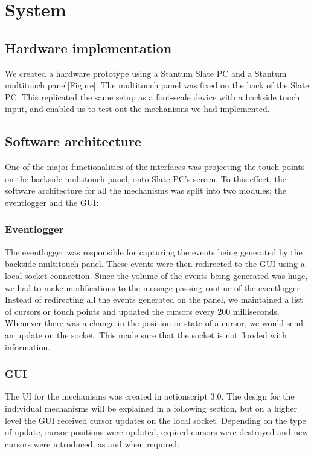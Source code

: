 \section{System}
\subsection{Hardware implementation}
We created a hardware prototype using a Stantum Slate PC and a Stantum multitouch panel[Figure]. The multitouch panel was fixed on the back of the Slate PC. This replicated the same setup as a foot-scale device with a backside touch input, and enabled us to test out the mechanisms we had implemented.
\subsection{Software architecture}
One of the major functionalities of the interfaces was projecting the touch points on the backside multitouch panel, onto Slate PC's screen. To this effect, the software architecture for all the mechanisms was split into two modules; the eventlogger and the GUI:
\subsubsection{Eventlogger}
The eventlogger was responsible for capturing the events being generated by the backside multitouch panel. These events were then redirected to the GUI using a local socket connection. Since the volume of the events being generated was huge, we had to make modifications to the message passing routine of the eventlogger. Instead of redirecting all the events generated on the panel, we maintained a list of cursors or touch points and updated the cursors every 200 milliseconds. Whenever there was a change in the position or state of a cursor, we would send an update on the socket. This made sure that the socket is not flooded with information. 
\subsubsection{GUI}
The UI for the mechanisms was created in actionscript 3.0. The design for the individual mechanisms will be explained in a following section, but on a higher level the GUI received cursor updates on the local socket. Depending on the type of update, cursor positions were updated, expired cursors were destroyed and new cursors were introduced, as and when required.